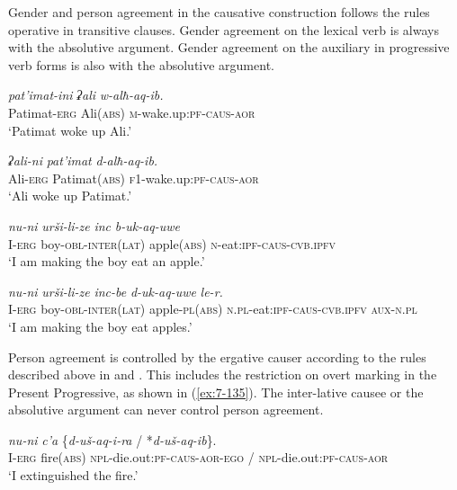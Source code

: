﻿\documentclass[output=paper]{langsci/langscibook}
\begin{document}
Gender and person agreement in the causative construction follows the
rules operative in transitive clauses. Gender agreement on the lexical
verb is always with the absolutive argument. Gender agreement on the
auxiliary in progressive verb forms is also with the absolutive argument.

\ea %
\ea %
\gll \emph{pat'imat-ini} \emph{ʡali} \emph{w-alħ-aq-ib.}\\
Patimat-\textsc{erg} Ali(\textsc{abs}) \textsc{m}-wake.up:\textsc{pf}-\textsc{caus}-\textsc{aor}\\
\glt `Patimat woke up Ali.'

\ex %
\gll \emph{ʡali-ni} \emph{pat'imat} \emph{d-alħ-aq-ib.}\\
Ali-\textsc{erg} Patimat(\textsc{abs}) \textsc{f1}-wake.up:\textsc{pf}-\textsc{caus}-\textsc{aor}\\
\glt `Ali woke up Patimat.'
\z

\ex\label{ex:7-135}
\ea %
{
\gll \emph{nu-ni} \emph{urši-li-ze} \emph{inc} \emph{b-uk-aq-uwe} \\
I-\textsc{erg} boy-\textsc{obl}-\textsc{inter(lat)} apple(\textsc{abs}) \textsc{n}-eat:\textsc{ipf}-\textsc{caus}-\textsc{cvb.ipfv} \\
\glt `I am making the boy eat an apple.'

}
\ex %
\gll \emph{nu-ni} \emph{urši-li-ze} \emph{inc-be} \emph{d-uk-aq-uwe} \emph{le-r.}\\
I-\textsc{erg} boy-\textsc{obl}-\textsc{inter(lat)} apple-\textsc{pl}(\textsc{abs}) \textsc{n.pl}-eat:\textsc{ipf}-\textsc{caus}-\textsc{cvb.ipfv} \textsc{aux}-\textsc{n.pl}\\
\glt `I am making the boy eat apples.'
\z
\z


Person agreement is controlled by the ergative causer according to the
rules described above in  and . This includes the
restriction on overt marking in the Present Progressive, as shown in
(\ref{ex:7-135}). The inter-lative causee or the absolutive argument can never
control person agreement.

\ea %
\gll \emph{nu-ni} \emph{c'a} \{\emph{d-uš-aq-i-ra} / *\emph{d-uš-aq-ib}\}.\\
I-\textsc{erg} fire(\textsc{abs}) \textsc{npl}-die.out:\textsc{pf}-\textsc{caus}-\textsc{aor}-\textsc{ego} / \textsc{npl}-die.out:\textsc{pf}-\textsc{caus}-\textsc{aor}\\ 
\glt `I extinguished the fire.'
\end{document}
